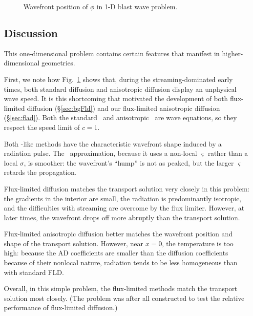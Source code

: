 \begin{figure}[htb]
  \centering\small
  
  \caption{Wavefront position of $\phi$ in 1-D blast wave problem.}
  \label{fig:1dblastWavefront}
\end{figure}

\subsection{Discussion}

This one-dimensional problem contains certain features that manifest in
higher-dimensional geometries.

First, we note how Fig.~\ref{fig:1dblastWavefront}
shows that, during the streaming-dominated early times, both standard diffusion
and anisotropic diffusion display an unphysical wave speed. It is this
shortcoming that motivated the development of both flux-limited diffusion
(\S\ref{sec:bgFld}) and our flux-limited anisotropic diffusion
(\S\ref{sec:flad}). Both the standard \Pone\ and anisotropic \Pone\ are wave
equations, so they respect the speed limit of $c=1$.

Both \Pone-like methods have the characteristic wavefront shape induced by a
radiation pulse. The \APone\ approximation, because it uses a non-local
$\varsigma$ rather than a local $\sigma$, is smoother: the wavefront's ``hump''
is not as peaked, but the larger $\varsigma$ retards the propagation.

Flux-limited diffusion matches the transport solution very closely in this
problem: the gradients in the interior are small, the radiation is predominantly
isotropic, and the difficulties with streaming are overcome by the flux limiter.
However, at later times, the wavefront drops off more abruptly than the
transport solution.

Flux-limited anisotropic diffusion better matches the wavefront position and
shape of the transport solution. However, near $x=0$, the temperature is too
high: because the AD coefficients are smaller than the diffusion coefficients
because of their nonlocal nature, radiation tends to be less homogeneous than
with standard FLD.

Overall, in this simple problem, the flux-limited methods match the transport
solution most closely. (The problem was after all constructed to test the
relative performance of flux-limited diffusion.)

